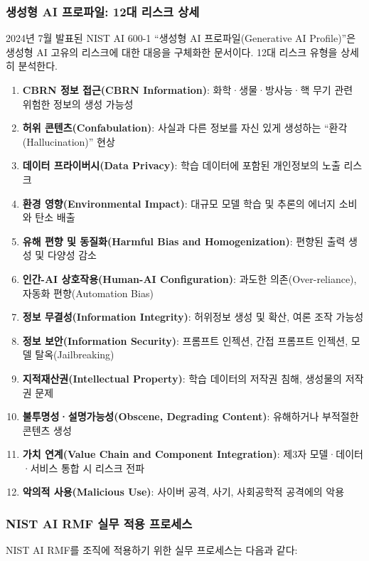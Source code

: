 \subsubsection{생성형 AI 프로파일: 12대 리스크 상세}

2024년 7월 발표된 NIST AI 600-1 ``생성형 AI 프로파일(Generative AI Profile)''은 생성형 AI 고유의 리스크에 대한 대응을 구체화한 문서이다. 12대 리스크 유형을 상세히 분석한다.

\begin{enumerate}
 \item \textbf{CBRN 정보 접근(CBRN Information)}: 화학·생물·방사능·핵 무기 관련 위험한 정보의 생성 가능성
 \item \textbf{허위 콘텐츠(Confabulation)}: 사실과 다른 정보를 자신 있게 생성하는 ``환각(Hallucination)'' 현상
 \item \textbf{데이터 프라이버시(Data Privacy)}: 학습 데이터에 포함된 개인정보의 노출 리스크
 \item \textbf{환경 영향(Environmental Impact)}: 대규모 모델 학습 및 추론의 에너지 소비와 탄소 배출
 \item \textbf{유해 편향 및 동질화(Harmful Bias and Homogenization)}: 편향된 출력 생성 및 다양성 감소
 \item \textbf{인간-AI 상호작용(Human-AI Configuration)}: 과도한 의존(Over-reliance), 자동화 편향(Automation Bias)
 \item \textbf{정보 무결성(Information Integrity)}: 허위정보 생성 및 확산, 여론 조작 가능성
 \item \textbf{정보 보안(Information Security)}: 프롬프트 인젝션, 간접 프롬프트 인젝션, 모델 탈옥(Jailbreaking)
 \item \textbf{지적재산권(Intellectual Property)}: 학습 데이터의 저작권 침해, 생성물의 저작권 문제
 \item \textbf{불투명성·설명가능성(Obscene, Degrading Content)}: 유해하거나 부적절한 콘텐츠 생성
 \item \textbf{가치 연계(Value Chain and Component Integration)}: 제3자 모델·데이터·서비스 통합 시 리스크 전파
 \item \textbf{악의적 사용(Malicious Use)}: 사이버 공격, 사기, 사회공학적 공격에의 악용
\end{enumerate}

\subsubsection{NIST AI RMF 실무 적용 프로세스}

NIST AI RMF를 조직에 적용하기 위한 실무 프로세스는 다음과 같다:

